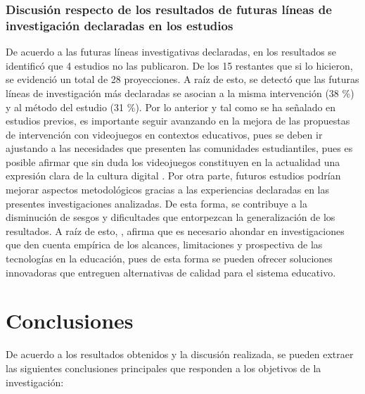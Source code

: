 \documentclass[spanish]{textolivre}
\begin{document}
\subsubsection{Discusión respecto de los resultados de futuras líneas de investigación declaradas en los estudios}
De acuerdo a las futuras líneas investigativas declaradas, en los resultados se identificó que 4 estudios no las publicaron. De los 15 restantes que si lo hicieron, se evidenció un total de 28 proyecciones. A raíz de esto, se detectó que las futuras líneas de investigación más declaradas se asocian a la misma intervención (38 \%) y al método del estudio (31 \%). Por lo anterior y tal como se ha señalado en estudios previos, es importante seguir avanzando en la mejora de las propuestas de intervención con videojuegos en contextos educativos, pues se deben ir ajustando a las necesidades que presenten las comunidades estudiantiles, pues es posible afirmar que sin duda los videojuegos constituyen en la actualidad una expresión clara de la cultura digital \cite{esnaola_mediacion_2018}. Por otra parte, futuros estudios podrían mejorar aspectos metodológicos gracias a las experiencias declaradas en las presentes investigaciones analizadas. De esta forma, se contribuye a la disminución de sesgos y dificultades que entorpezcan la generalización de los resultados. A raíz de esto, \textcite{islas_torres_implicacion_2017}, afirma que es necesario ahondar en investigaciones que den cuenta empírica de los alcances, limitaciones y prospectiva de las tecnologías en la educación, pues de esta forma se pueden ofrecer soluciones innovadoras que entreguen alternativas de calidad para el sistema educativo.

\section{Conclusiones}
De acuerdo a los resultados obtenidos y la discusión realizada, se pueden extraer las siguientes conclusiones principales que responden a los objetivos de la investigación:
\end{document}
